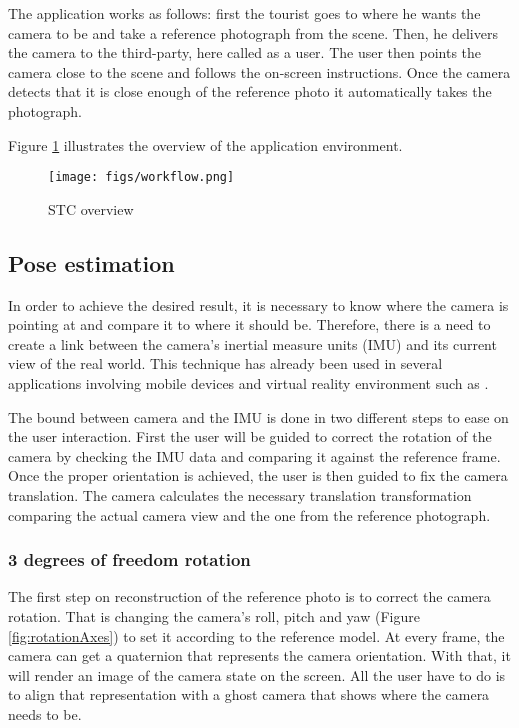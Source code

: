 \documentclass[12pt]{article}
\begin{document}
The application works as follows: first the tourist goes to where he wants the camera to be and take a reference photograph from the scene. Then, he delivers the camera to the third-party, here called as a user. The user then points the camera close to the scene and follows the on-screen instructions. Once the camera detects that it is close enough of the reference photo it automatically takes the photograph.

Figure \ref{fig:schematic} illustrates the overview of the application environment.

\begin{figure}[ht]
\centering
\texttt{[image: figs/workflow.png]}
\caption{STC overview}
\label{fig:schematic}
\end{figure}


\subsection{Pose estimation}
In order to achieve the desired result, it is necessary to know where the camera is pointing at and compare it to where it should be. Therefore, there is a need to create a link between the camera's inertial measure units (IMU) and its current view of the real world. This technique has already been used in several applications involving mobile devices and virtual reality environment such as \cite{Hol:06}.

The bound between camera and the IMU is done in two different steps to ease on the user interaction. First the user will be guided to correct the rotation of the camera by checking the IMU data and comparing it against the reference frame. Once the proper orientation is achieved, the user is then guided to fix the camera translation. The camera calculates the necessary translation transformation comparing the actual camera view and the one from the reference photograph.

\subsubsection{3 degrees of freedom rotation}
The first step on reconstruction of the reference photo is to correct the camera rotation. That is changing the camera's roll, pitch and yaw (Figure \ref{fig:rotationAxes}) to set it according to the reference model. At every frame, the camera can get a quaternion that represents the camera orientation. With that, it will render an image of the camera state on the screen. All the user have to do is to align that representation with a ghost camera that shows where the camera needs to be. 
\end{document}
